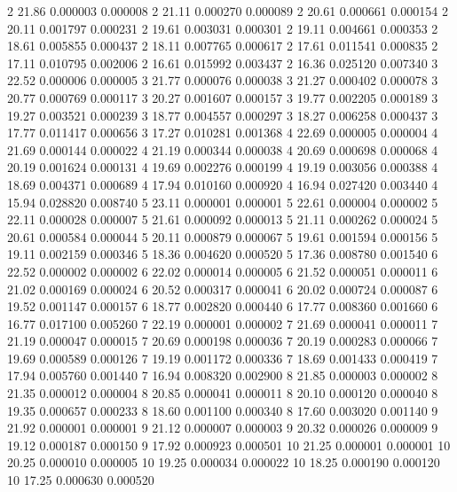 2 21.86   0.000003 0.000008
2 21.11   0.000270 0.000089
2 20.61   0.000661 0.000154
2 20.11   0.001797 0.000231
2 19.61   0.003031 0.000301
2 19.11   0.004661 0.000353
2 18.61   0.005855 0.000437
2 18.11   0.007765 0.000617
2 17.61   0.011541 0.000835
2 17.11   0.010795 0.002006
2 16.61   0.015992 0.003437
2 16.36   0.025120 0.007340
3 22.52   0.000006 0.000005
3 21.77   0.000076 0.000038
3 21.27   0.000402 0.000078
3 20.77   0.000769 0.000117
3 20.27   0.001607 0.000157
3 19.77   0.002205 0.000189
3 19.27   0.003521 0.000239
3 18.77   0.004557 0.000297
3 18.27   0.006258 0.000437
3 17.77   0.011417 0.000656
3 17.27   0.010281 0.001368
4 22.69   0.000005 0.000004
4 21.69   0.000144 0.000022
4 21.19   0.000344 0.000038
4 20.69   0.000698 0.000068
4 20.19   0.001624 0.000131
4 19.69   0.002276 0.000199
4 19.19   0.003056 0.000388
4 18.69   0.004371 0.000689
4 17.94   0.010160 0.000920
4 16.94   0.027420 0.003440
4 15.94   0.028820 0.008740
5   23.11   0.000001 0.000001
5   22.61   0.000004 0.000002
5   22.11   0.000028 0.000007
5   21.61   0.000092 0.000013
5   21.11   0.000262 0.000024
5   20.61   0.000584 0.000044
5   20.11   0.000879 0.000067
5   19.61   0.001594 0.000156
5   19.11   0.002159 0.000346
5   18.36   0.004620 0.000520
5   17.36   0.008780 0.001540
6   22.52   0.000002 0.000002
6   22.02   0.000014 0.000005
6   21.52   0.000051 0.000011
6   21.02   0.000169 0.000024
6   20.52   0.000317 0.000041
6   20.02   0.000724 0.000087
6   19.52   0.001147 0.000157
6    18.77   0.002820 0.000440
6    17.77   0.008360 0.001660
6    16.77   0.017100 0.005260
7   22.19   0.000001 0.000002
7   21.69   0.000041 0.000011
7   21.19   0.000047 0.000015
7   20.69   0.000198 0.000036
7   20.19   0.000283 0.000066
7   19.69   0.000589 0.000126
7   19.19   0.001172 0.000336
7   18.69   0.001433 0.000419
7   17.94   0.005760 0.001440
7   16.94   0.008320 0.002900
8   21.85   0.000003 0.000002
8   21.35   0.000012 0.000004
8   20.85   0.000041 0.000011
8   20.10   0.000120 0.000040
8   19.35   0.000657 0.000233
8   18.60   0.001100 0.000340
8   17.60   0.003020 0.001140
9   21.92   0.000001 0.000001
9   21.12   0.000007 0.000003
9   20.32   0.000026 0.000009
9   19.12   0.000187 0.000150
9   17.92   0.000923 0.000501 
10   21.25   0.000001 0.000001
10   20.25   0.000010 0.000005
10   19.25   0.000034 0.000022
10   18.25   0.000190 0.000120
10   17.25   0.000630 0.000520
